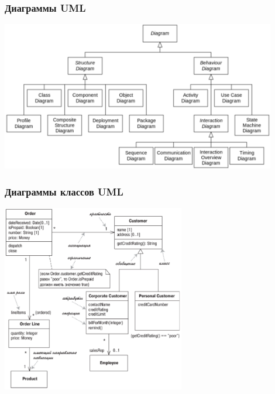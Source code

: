 \documentclass{../../slides-style}
\begin{document}
    \begin{frame}
        \frametitle{Диаграммы UML}
        \begin{center}
            \includegraphics[width=0.9\textwidth]{umlDiagrams.png}
        \end{center}
    \end{frame}

    \begin{frame}
        \frametitle{Диаграммы классов UML}
        \begin{center}
            \includegraphics[width=0.6\textwidth]{umlClassDiagram.png}
        \end{center}
    \end{frame}
\end{document}
